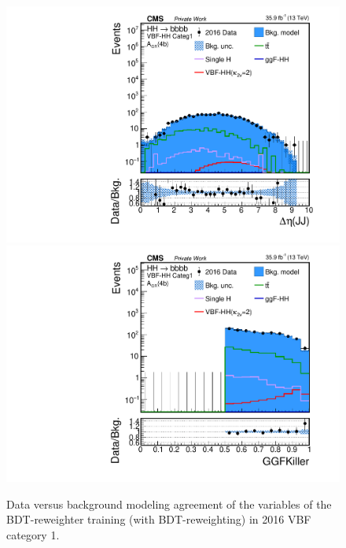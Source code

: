 \begin{figure}[htbp!]
\begin{center}
\includegraphics[width=0.24\linewidth]{Figures/Modeling/background/plotsDatadrivenWithBDT/2016/VBFcateg1_CR_110/Histogram/plot2016_j1j2_deltaEta_Btag4_VBFcateg1_CR_110_Histogram_log.pdf}
\includegraphics[width=0.24\linewidth]{Figures/Modeling/background/plotsDatadrivenWithBDT/2016/VBFcateg1_CR_110/Histogram/plot2016_GGFKiller_Btag4_VBFcateg1_CR_110_Histogram_log.pdf}
\end{center}
\caption{Data versus background modeling agreement of the variables of the BDT-reweighter training (with BDT-reweighting) in 2016 VBF category 1.}
\label{bkg:fig:bdtregvarvbf1_2016}
\end{figure}

